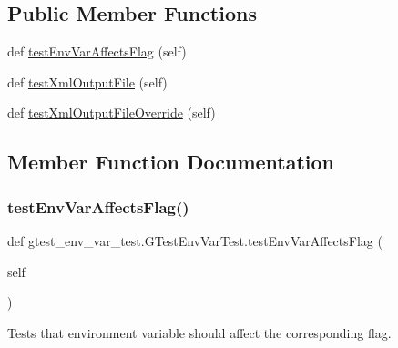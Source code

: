 \subsection*{Public Member Functions}
\begin{DoxyCompactItemize}
\item 
def \mbox{\hyperlink{classgtest__env__var__test_1_1_g_test_env_var_test_ad169061caa22a6cd510535d6da94b97e}{test\+Env\+Var\+Affects\+Flag}} (self)
\item 
def \mbox{\hyperlink{classgtest__env__var__test_1_1_g_test_env_var_test_ae2f623209c115e094965e606cd34eec4}{test\+Xml\+Output\+File}} (self)
\item 
def \mbox{\hyperlink{classgtest__env__var__test_1_1_g_test_env_var_test_ae41b9b9569eb327d5886cb811c2995a7}{test\+Xml\+Output\+File\+Override}} (self)
\end{DoxyCompactItemize}


\subsection{Member Function Documentation}
\mbox{\label{classgtest__env__var__test_1_1_g_test_env_var_test_ad169061caa22a6cd510535d6da94b97e}} 
\subsubsection{\texorpdfstring{test\+Env\+Var\+Affects\+Flag()}{testEnvVarAffectsFlag()}}
{\footnotesize\ttfamily def gtest\+\_\+env\+\_\+var\+\_\+test.\+G\+Test\+Env\+Var\+Test.\+test\+Env\+Var\+Affects\+Flag (\begin{DoxyParamCaption}\item[{}]{self }\end{DoxyParamCaption})}

\begin{DoxyVerb}Tests that environment variable should affect the corresponding flag.\end{DoxyVerb}
 \mbox{\label{classgtest__env__var__test_1_1_g_test_env_var_test_ae2f623209c115e094965e606cd34eec4}} 
